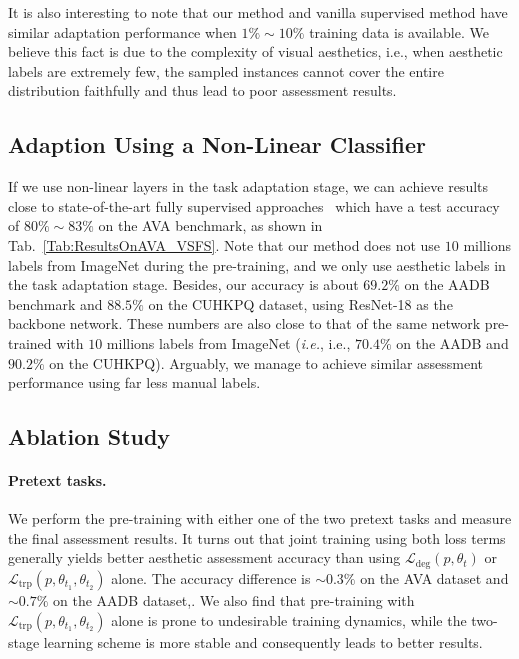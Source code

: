 \documentclass[letterpaper]{article}
\newcommand{\patch}{p}
\newcommand{\transformation}{t}
\newcommand{\loss}{\mathcal{L}}
\newcommand{\degradationloss}{\loss_{\mathrm{deg}}}
\newcommand{\tripletloss}{\loss_{\mathrm{trp}}}
\begin{document}
It is also interesting to note that our method and vanilla supervised method have similar adaptation performance when $1\% \sim 10 \%$ training data is available.
We believe this fact is due to the complexity of visual aesthetics, i.e., when aesthetic labels are extremely few, the sampled instances cannot cover the entire distribution faithfully and thus lead to poor assessment results.

\subsection{Adaption Using a Non-Linear Classifier}
If we use non-linear layers in the task adaptation stage, we can achieve results close to state-of-the-art fully supervised approaches~\cite{ma2017lamp,sheng2018attention,talebi2018nima,hosu2019effective} which have a test accuracy of $80\%\sim83\%$ on the AVA benchmark, as shown in Tab.~\ref{Tab:ResultsOnAVA_VSFS}.
Note that our method does not use $10$ millions labels from ImageNet during the pre-training, and we only use aesthetic labels in the task adaptation stage.
Besides, our accuracy is about $69.2\%$ on the AADB benchmark and $88.5\%$ on the CUHKPQ dataset, using ResNet-18 as the backbone network.
These numbers are also close to that of the same network pre-trained with $10$ millions labels from ImageNet (\emph{i.e.}, i.e., $70.4\%$ on the AADB and $90.2\%$ on the CUHKPQ).
Arguably, we manage to achieve similar assessment performance using far less manual labels.

\subsection{Ablation Study}
\label{sec:ablation_study}

\paragraph{Pretext tasks.}
We perform the pre-training with either one of the two pretext tasks and measure the final assessment results.
It turns out that joint training using both loss terms generally yields better aesthetic assessment accuracy than using $\degradationloss(\patch, \theta_{\transformation})$ or $\tripletloss(\patch, \theta_{\transformation_1}, \theta_{\transformation_2})$ alone.
The accuracy difference is $\sim 0.3\%$ on the AVA dataset and $\sim 0.7\%$ on the AADB dataset,.
We also find that pre-training with $\tripletloss(\patch, \theta_{\transformation_1}, \theta_{\transformation_2})$ alone is prone to undesirable training dynamics, while the two-stage learning scheme is more stable and consequently leads to better results.
\end{document}
